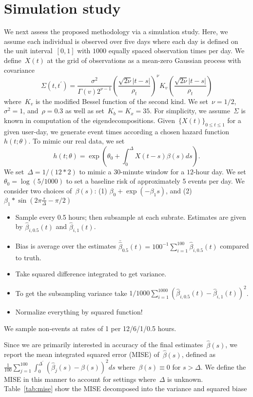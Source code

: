 \documentclass[11pt]{amsart}
\begin{document}
\section{Simulation study} \label{section:simstudy}


We next assess the proposed methodology via a simulation study. Here, we assume each individual is observed over five days where each day is defined on the unit interval~$[0,1]$ with $1000$ equally spaced observation times per day. We define~$X(t)$ at the grid of observations as a mean-zero Gaussian process with covariance
\[
  \Sigma (t, t^\prime) =
  \frac{\sigma^2}{\Gamma (v) 2^{\nu-1}}
  \left( \frac{\sqrt{2 \nu} |t-s|}{\rho_t} \right)^{\nu}
  K_v \left( \frac{\sqrt{2 \nu} |t-s|}{\rho_t} \right)
\]
where~$K_v$ is the modified Bessel function of the second kind.  We set~$\nu = 1/2$, $\sigma^2 = 1$, and~$\rho = 0.3$ as well as set~$K_b = K_x = 35$.  For simplicity, we assume~$\Sigma$ is known in computation of the eigendecompositions. Given~$\{ X(t) \}_{0 \leq t \leq 1}$ for a given user-day, we generate event times according a chosen hazard function~$h (t; \theta)$.  To mimic our real data, we set
\[
h(t; \theta) = \exp \left( \theta_0 + \int_{0}^{\Delta} X(t-s) \beta(s) ds \right).
\]
We set~$\Delta = 1/(12*2)$ to mimic a $30$-minute window for a $12$-hour day.  We set~$\theta_0 = \log(5/1000)$ to set a baseline risk of approximately 5 events per day. We consider two choices of~$\beta(s)$: (1) $\beta_0 + \exp(- \beta_1 s) $, and (2) $\beta_1  * \sin \left( 2 \pi \frac{s}{\Delta} - \pi/2 \right)$

\begin{itemize}
\item Sample every 0.5 hours; then subsample at each subrate. Estimates are given by $\hat \beta_{i,0.5} (t)$ and $\hat \beta_{i,1} (t)$.
\item Bias is average over the estimates $\bar \hat \beta_{0.5} (t) = 100^{-1} \sum_{i=1}^100 \hat \beta_{i, 0.5} (t)$ compared to truth.
\item Take squared difference integrated to get variance.
\item To get the subsampling variance take $1/1000 \sum_{i=1}^1000 (\hat \beta_{i,0.5} (t) - \hat \beta_{i,1} (t))^2$.
\item Normalize everything by squared function!
\end{itemize}


We sample non-events at rates of 1 per 12/6/1/0.5 hours.

Since we are primarily interested in accuracy of the final estimates~$\hat \beta(s)$, we report the mean integrated squared error (MISE) of~$\hat \beta (s)$, defined as~$\frac{1}{100} \sum_{j=1}^{100} \int_{0}^{\Delta^\prime} ( \hat \beta_j (s) - \beta(s))^2 ds$ where~$\beta(s) \equiv 0$ for $s > \Delta$.  We define the MISE in this manner to account for settings where~$\Delta$ is unknown. Table~\ref{tab:mise} show the MISE decomposed into the variance and squared biase
\end{document}
